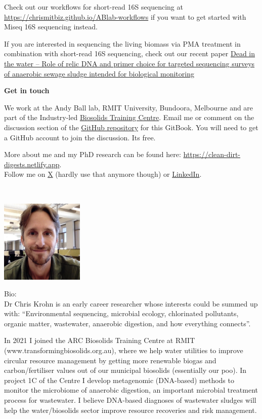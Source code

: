 \documentclass[
]{book}
\begin{document}
Check out our workflows for short-read 16S sequencing at \url{https://chrismitbiz.github.io/ABlab-workflows} if you want to get started with Miseq 16S sequencing instead.

If you are interested in sequencing the living biomass via PMA treatment in combination with short-read 16S sequencing, check out our recent paper \href{https://doi.org/10.1016/j.watres.2024.121354}{Dead in the water -- Role of relic DNA and primer choice for targeted sequencing surveys of anaerobic sewage sludge intended for biological monitoring} \citep{Krohn2024}

\textbf{Get in touch}

We work at the Andy Ball lab, RMIT University, Bundoora, Melbourne and are part of the Industry-led \href{https://www.transformingbiosolids.org.au}{Biosolids Training Centre}. Email me or comment on the discussion section of the \href{https://github.com/chrismitbiz/ABlab-workflows/discussions/}{GitHub repository} for this GitBook. You will need to get a GitHub account to join the discussion. Its free.

More about me and my PhD research can be found here: \url{https://clean-dirt-digests.netlify.app}.\\
Follow me on \href{https://twitter.com/CleanDirtChris}{X} (hardly use that anymore though) or \href{https://www.linkedin.com/in/christian-krohn-54904855}{LinkedIn}.

~

\includegraphics[width=1.5625in,height=\textheight]{./img/avatar.jpg}

Bio:\\
Dr Chris Krohn is an early career researcher whose interests could be summed up with: ``Environmental sequencing, microbial ecology, chlorinated pollutants, organic matter, wastewater, anaerobic digestion, and how everything connects''.

In 2021 I joined the ARC Biosolids Training Centre at RMIT (www.transformingbiosolids.org.au), where we help water utilities to improve circular resource management by getting more renewable biogas and carbon/fertiliser values out of our municipal biosolids (essentially our poo). In project 1C of the Centre I develop metagenomic (DNA-based) methods to monitor the microbiome of anaerobic digestion, an important microbial treatment process for wastewater. I believe DNA-based diagnoses of wastewater sludges will help the water/biosolids sector improve resource recoveries and risk management.
\end{document}
